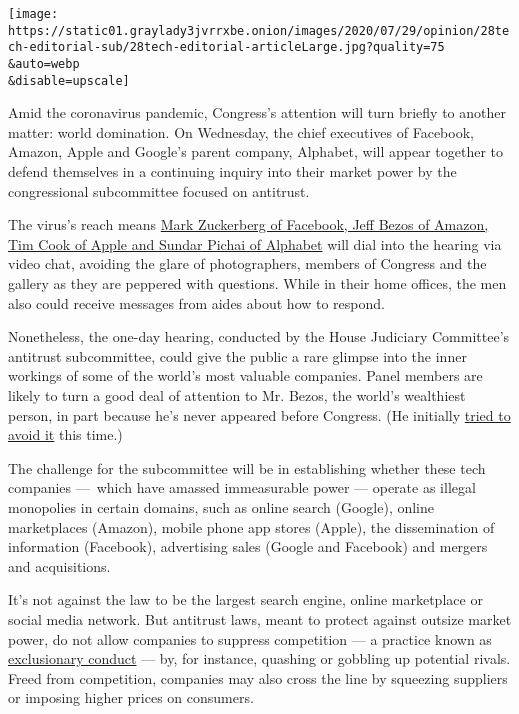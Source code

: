\texttt{[image: https://static01.graylady3jvrrxbe.onion/images/2020/07/29/opinion/28tech-editorial-sub/28tech-editorial-articleLarge.jpg?quality=75\\\&auto=webp\\\&disable=upscale]}

Amid the coronavirus pandemic, Congress's attention will turn briefly to
another matter: world domination. On Wednesday, the chief executives of
Facebook, Amazon, Apple and Google's parent company, Alphabet, will
appear together to defend themselves in a continuing inquiry into their
market power by the congressional subcommittee focused on antitrust.

The virus's reach means
\href{https://www.nytimes3xbfgragh.onion/live/2020/07/29/technology/tech-ceos-hearing-testimony}{Mark
Zuckerberg of Facebook, Jeff Bezos of Amazon, Tim Cook of Apple and
Sundar Pichai of Alphabet} will dial into the hearing via video chat,
avoiding the glare of photographers, members of Congress and the gallery
as they are peppered with questions. While in their home offices, the
men also could receive messages from aides about how to respond.

Nonetheless, the one-day hearing, conducted by the House Judiciary
Committee's antitrust subcommittee, could give the public a rare glimpse
into the inner workings of some of the world's most valuable companies.
Panel members are likely to turn a good deal of attention to Mr. Bezos,
the world's wealthiest person, in part because he's never appeared
before Congress. (He initially
\href{https://www.nytimes3xbfgragh.onion/2020/05/15/technology/jeff-bezos-amazon-testimony-congress.html}{tried
to avoid it} this time.)

The challenge for the subcommittee will be in establishing whether these
tech companies ---~which have amassed immeasurable power --- operate as
illegal monopolies in certain domains, such as online search (Google),
online marketplaces (Amazon), mobile phone app stores (Apple), the
dissemination of information (Facebook), advertising sales (Google and
Facebook) and mergers and acquisitions.

It's not against the law to be the largest search engine, online
marketplace or social media network. But antitrust laws, meant to
protect against outsize market power, do not allow companies to suppress
competition --- a practice known as
\href{https://www.ftc.gov/tips-advice/competition-guidance/guide-antitrust-laws/single-firm-conduct/monopolization-defined}{exclusionary
conduct} --- by, for instance, quashing or gobbling up potential rivals.
Freed from competition, companies may also cross the line by squeezing
suppliers or imposing higher prices on consumers.


